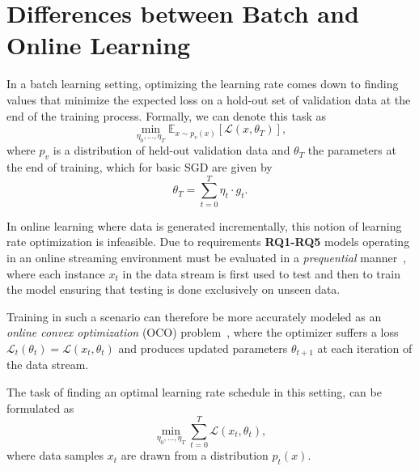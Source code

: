 \documentclass[letterpaper]{article} %
\begin{document}
\section{Differences between Batch and Online Learning}

In a batch learning setting, optimizing the learning rate comes down to finding values that minimize the expected loss on a hold-out set of validation data at the end of the training process.
Formally, we can denote this task as
\begin{equation}
	\label{eq:batch_lr_optim}
	\min_{\eta_0, \ldots, \eta_T} \mathbb{E}_{x \sim p_v(x)}[\mathcal{L}(x, \theta_T)],
\end{equation}
where $p_v$ is a distribution of held-out validation data and $\theta_T$ the parameters at the end of training, which for basic SGD are given by
\begin{equation}
	\theta_T = \sum_{t=0}^{T} \eta_t \cdot g_t.
\end{equation}

In online learning where data is generated incrementally, this notion of learning rate optimization is infeasible.
Due to requirements \textbf{RQ1-RQ5} models operating in an online streaming environment must be evaluated in a \textit{prequential} manner~\cite{bifetMOAMassiveOnline2010}, where each instance $x_t$ in the data stream is first used to test and then to train the model ensuring that testing is done exclusively on unseen data.

Training in such a scenario can therefore be more accurately modeled as an \textit{online convex optimization} (OCO) problem~\cite{shalev-shwartzOnlineLearningOnline2011,hazanIntroductionOnlineConvex2016}, where the optimizer suffers a loss $\mathcal{L}_t(\theta_t) = \mathcal{L}(x_t, \theta_{t})$ and produces updated parameters $\theta_{t+1}$ at each iteration of the data stream.

The task of finding an optimal learning rate schedule in this setting, can be formulated as
\begin{equation}
	\label{eq:stream_lr_optim}
	\min_{\eta_0, \ldots, \eta_T} \sum_{t=0}^{T} \mathcal{L}(x_t, \theta_t),
\end{equation}
where data samples $x_t$ are drawn from a distribution $p_t(x)$.
\end{document}
